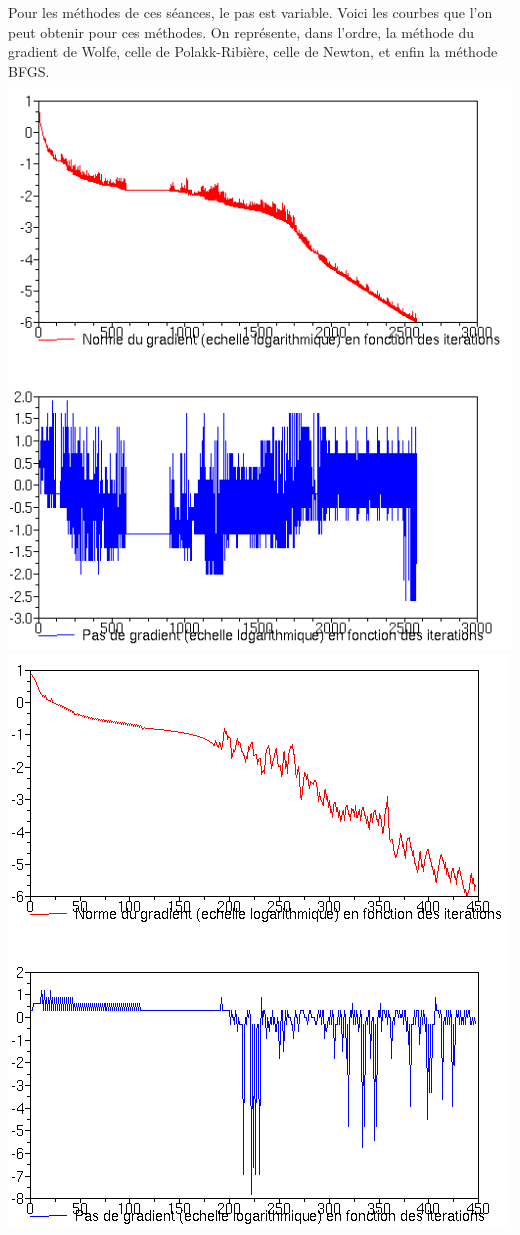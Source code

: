 \documentclass[12pt, letterpaper]{article}
\begin{document}
Pour les méthodes de ces séances, le pas est variable. Voici les courbes que l'on peut obtenir pour ces méthodes. On représente, dans l'ordre, la méthode du gradient de Wolfe, celle de Polakk-Ribière, celle de Newton, et enfin la méthode BFGS. \\
\includegraphics[scale=0.5]{gradw.png} \\
\includegraphics[scale=0.5]{Polak.png} \\
\end{document}
